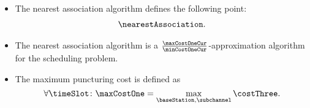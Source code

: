 \begin{frame}
  \begin{itemize}
    \item The nearest association algorithm defines the following point:
      \begin{align*}
        \nearestAssociation.
      \end{align*}
  \end{itemize}
\end{frame}

\begin{frame}
  \begin{itemize}
    \item The nearest association algorithm is a $\frac{\maxCostOneCur}{\minCostOneCur}$-approximation algorithm for the scheduling problem\proofFootnote.
  \end{itemize}
\end{frame}

\begin{frame}
  \begin{itemize}
    \item The maximum puncturing cost is defined as
      \begin{equation}
        \forall\timeSlot \colon \maxCostOne = \max_{\baseStation, \subchannel}{\costThree}.
      \end{equation}
  \end{itemize}
\end{frame}

